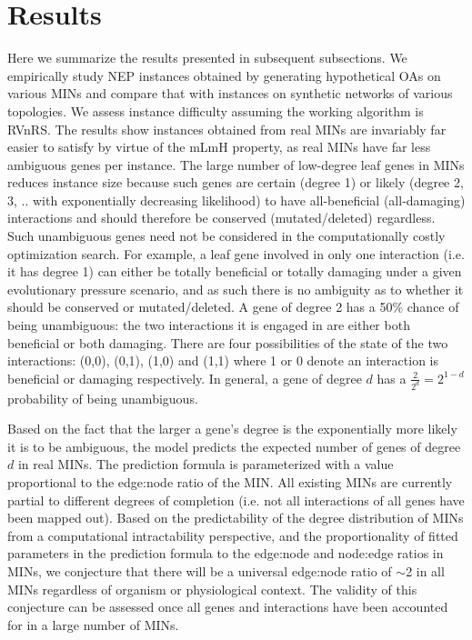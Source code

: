 \documentclass[12pt]{article}
\begin{document}
\section{Results}
Here we summarize the results presented in subsequent subsections. We empirically study NEP instances obtained by generating hypothetical OAs on various MINs and compare that with instances on synthetic networks of various topologies. We assess instance difficulty assuming the working algorithm is RVnRS. The results show instances obtained from  real MINs are invariably far easier to satisfy by virtue of the mLmH property, as real MINs have far less ambiguous genes per instance. The large number of low-degree leaf genes in MINs reduces  instance size because such genes are certain (degree 1) or likely (degree 2, 3, .. with exponentially decreasing likelihood) to have all-beneficial  (all-damaging) interactions and should therefore be conserved (mutated/deleted) regardless. Such unambiguous genes need not be considered in the computationally costly optimization search. For example, a leaf gene involved in only one interaction (i.e. it has degree 1)  can either be totally beneficial or totally damaging  under a given evolutionary pressure scenario, and as such there is no ambiguity as to whether it should be conserved or mutated/deleted. A gene of degree 2 has a 50\% chance of being unambiguous: the two interactions it is engaged in are either both beneficial or both damaging. There are four possibilities of the state of the two interactions: (0,0), (0,1), (1,0) and (1,1) where 1 or 0 denote an interaction is beneficial or damaging respectively.  In general, a gene of degree $d$ has a $\frac{2}{2^d} = 2^{1-d}$ probability of being unambiguous.

Based on the fact that the larger a gene's degree is the exponentially more likely it is to be ambiguous,  the model predicts the expected number of genes of degree $d$ in real MINs. The prediction formula is parameterized with a value proportional to the  edge:node ratio of the MIN. All existing MINs are currently partial to different degrees of completion (i.e. not all interactions of all genes have been mapped out). Based on the predictability of the degree distribution of MINs from a computational intractability perspective, and the proportionality of fitted parameters in the prediction formula to the edge:node and node:edge ratios in MINs, we conjecture that there will be a universal edge:node ratio of ${\sim}$2 in all MINs regardless of organism or physiological context. The validity of this conjecture can be assessed once all genes and interactions have been accounted for in a large number of MINs.
\end{document}
